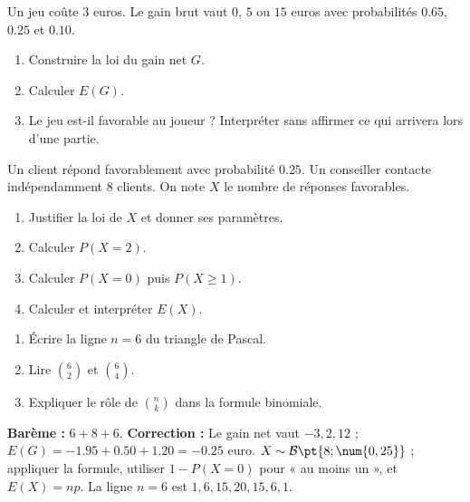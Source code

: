 \begin{exercise}
Un jeu coûte $3$ euros. Le gain brut vaut $0$, $5$ ou $15$ euros avec probabilités $\num{0,65}$, $\num{0,25}$ et $\num{0,10}$.
\begin{enumerate}
\item Construire la loi du gain net $G$.
\item Calculer $E(G)$.
\item Le jeu est-il favorable au joueur ? Interpréter sans affirmer ce qui arrivera lors d'une partie.
\end{enumerate}
\end{exercise}
\begin{exercise}
Un client répond favorablement avec probabilité $\num{0,25}$. Un conseiller contacte indépendamment $8$ clients. On note $X$ le nombre de réponses favorables.
\begin{enumerate}
\item Justifier la loi de $X$ et donner ses paramètres.
\item Calculer $P(X=2)$.
\item Calculer $P(X=0)$ puis $P(X\geq1)$.
\item Calculer et interpréter $E(X)$.
\end{enumerate}
\end{exercise}
\begin{exercise}
\begin{enumerate}
\item Écrire la ligne $n=6$ du triangle de Pascal.
\item Lire $\binom62$ et $\binom64$.
\item Expliquer le rôle de $\binom nk$ dans la formule binomiale.
\end{enumerate}
\end{exercise}
\begin{solution}\textbf{Barème :} $6+8+6$. \textbf{Correction :} Le gain net vaut $-3,2,12$ ; $E(G)=-\num{1,95}+\num{0,50}+\num{1,20}=-\num{0,25}$ euro. $X\sim\mathcal B\pt{8;\num{0,25}}$ ; appliquer la formule, utiliser $1-P(X=0)$ pour « au moins un », et $E(X)=np$. La ligne $n=6$ est $1,6,15,20,15,6,1$.\end{solution}
